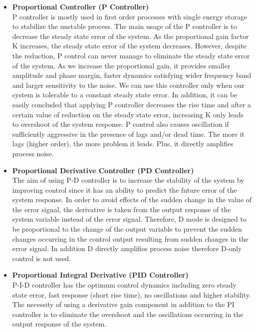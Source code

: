 \begin{itemize}
    \item \textbf{Proportional Controller (P Controller)} \\
    P controller is mostly used in first order processes with single energy storage to stabilize the unstable process. The main usage of the P controller is to decrease the steady state error of the system. As the proportional gain factor K increases, the steady state error of the system decreases. However, despite the reduction, P control can never manage to eliminate the steady state error of the system. As we increase the proportional gain, it provides smaller amplitude and phase margin, faster dynamics satisfying wider frequency band and larger sensitivity to the noise. We can use this controller only when our system is tolerable to a constant steady state error. In addition, it can be easily concluded that applying P controller decreases the rise time and after a certain value of reduction on the steady state error, increasing K only leads to overshoot of the system response. P control also causes oscillation if sufficiently aggressive in the presence of lags and/or dead time. The more it lags (higher order), the more problem it leads. Plus, it directly amplifies process noise. 
    \item \textbf{Proportional Derivative Controller (PD Controller)} \\
    The aim of using P-D controller is to increase the stability of the system by improving control since it has an ability to predict the future error of the system response. In order to avoid effects of the sudden change in the value of the error signal, the derivative is taken from the output response of the system variable instead of the error signal. Therefore, D mode is designed to be proportional to the change of the output variable to prevent the sudden changes occurring in the control output resulting from sudden changes in the error signal. In addition D directly amplifies process noise therefore D-only control is not used.
    \item \textbf{Proportional Integral Derivative (PID Controller)}\\ P-I-D controller has the optimum control dynamics including zero steady state error, fast response (short rise time), no oscillations and higher stability. The necessity of using a derivative gain component in addition to the PI controller is to eliminate the overshoot and the oscillations occurring in the output response of the system.
\end{itemize} 

